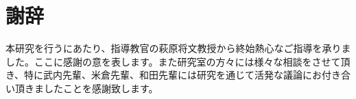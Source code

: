 \chapter*{謝辞}
本研究を行うにあたり、指導教官の萩原将文教授から終始熱心なご指導を承りました。ここに感謝の意を表します。また研究室の方々には様々な相談をさせて頂き、特に武内先輩、米倉先輩、和田先輩には研究を通じて活発な議論にお付き合い頂きましたことを感謝致します。

